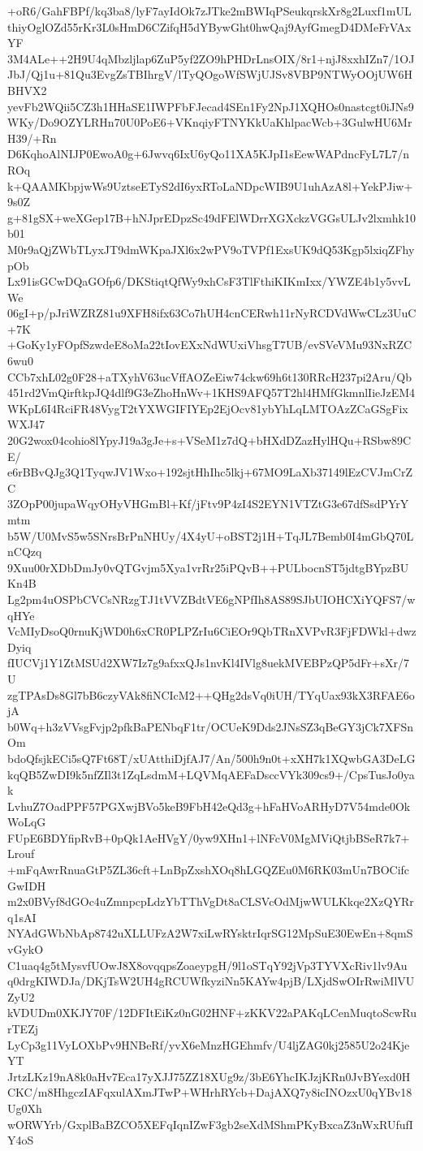+oR6/GahFBPf/kq3ba8/lyF7ayIdOk7zJTke2mBWIqPSeukqrskXr8g2Luxf1mUL
thiyOglOZd55rKr3L0sHmD6CZifqH5dYBywGht0hwQaj9AyfGmegD4DMeFrVAxYF
3M4ALe++2H9U4qMbzljlap6ZuP5yf2ZO9hPHDrLnsOIX/8r1+njJ8xxhIZn7/1OJ
JbJ/Qj1u+81Qu3EvgZsTBIhrgV/lTyQOgoWfSWjUJSv8VBP9NTWyOOjUW6HBHVX2
yevFb2WQii5CZ3h1HHaSE1IWPFbFJecad4SEn1Fy2NpJ1XQHOs0nastcgt0iJNs9
WKy/Do9OZYLRHn70U0PoE6+VKnqiyFTNYKkUaKhlpacWcb+3GulwHU6MrH39/+Rn
D6KqhoAlNIJP0EwoA0g+6Jwvq6IxU6yQo11XA5KJpI1sEewWAPdncFyL7L7/nROq
k+QAAMKbpjwWs9UztseETyS2dI6yxRToLaNDpcWIB9U1uhAzA8l+YekPJiw+9s0Z
g+81gSX+weXGep17B+hNJprEDpzSc49dFElWDrrXGXckzVGGsULJv2lxmhk10b01
M0r9aQjZWbTLyxJT9dmWKpaJXl6x2wPV9oTVPf1ExsUK9dQ53Kgp5lxiqZFhypOb
Lx91isGCwDQaGOfp6/DKStiqtQfWy9xhCsF3TlFthiKIKmIxx/YWZE4b1y5vvLWe
06gI+p/pJriWZRZ81u9XFH8ifx63Co7hUH4cnCERwh11rNyRCDVdWwCLz3UuC+7K
+GoKy1yFOpfSzwdeE8oMa22tIovEXxNdWUxiVhsgT7UB/evSVeVMu93NxRZC6wu0
CCb7xhL02g0F28+aTXyhV63ucVffAOZeEiw74ckw69h6t130RRcH237pi2Aru/Qb
451rd2VmQirftkpJQ4dlf9G3eZhoHnWv+1KHS9AFQ57T2hl4HMfGkmnlIieJzEM4
WKpL6I4RciFR48VygT2tYXWGIFIYEp2EjOcv81ybYhLqLMTOAzZCaGSgFixWXJ47
20G2wox04cohio8lYpyJ19a3gJe+s+VSeM1z7dQ+bHXdDZazHylHQu+RSbw89CE/
e6rBBvQJg3Q1TyqwJV1Wxo+192sjtHhIhc5lkj+67MO9LaXb37149lEzCVJmCrZC
3ZOpP00jupaWqyOHyVHGmBl+Kf/jFtv9P4zI4S2EYN1VTZtG3e67dfSsdPYrYmtm
b5W/U0MvS5w5SNrsBrPnNHUy/4X4yU+oBST2j1H+TqJL7Bemb0I4mGbQ70LnCQzq
9Xuu00rXDbDmJy0vQTGvjm5Xya1vrRr25iPQvB++PULbocnST5jdtgBYpzBUKn4B
Lg2pm4uOSPbCVCsNRzgTJ1tVVZBdtVE6gNPfIh8AS89SJbUIOHCXiYQFS7/wqHYe
VcMIyDsoQ0rnuKjWD0h6xCR0PLPZrIu6CiEOr9QbTRnXVPvR3FjFDWkl+dwzDyiq
fIUCVj1Y1ZtMSUd2XW7Iz7g9afxxQJs1nvKl4IVlg8uekMVEBPzQP5dFr+sXr/7U
zgTPAsDs8Gl7bB6czyVAk8fiNCIcM2++QHg2dsVq0iUH/TYqUax93kX3RFAE6ojA
b0Wq+h3zVVsgFvjp2pfkBaPENbqF1tr/OCUeK9Dds2JNsSZ3qBeGY3jCk7XFSnOm
bdoQfsjkECi5sQ7Ft68T/xUAtthiDjfAJ7/An/500h9n0t+xXH7k1XQwbGA3DeLG
kqQB5ZwDI9k5nfZIl3t1ZqLsdmM+LQVMqAEFaDsccVYk309cs9+/CpsTusJo0yak
LvhuZ7OadPPF57PGXwjBVo5keB9FbH42eQd3g+hFaHVoARHyD7V54mde0OkWoLqG
FUpE6BDYfipRvB+0pQk1AeHVgY/0yw9XHn1+lNFcV0MgMViQtjbBSeR7k7+Lrouf
+mFqAwrRnuaGtP5ZL36cft+LnBpZxshXOq8hLGQZEu0M6RK03mUn7BOCifcGwIDH
m2x0BVyf8dGOc4uZmnpcpLdzYbTThVgDt8aCLSVcOdMjwWULKkqe2XzQYRrq1sAI
NYAdGWbNbAp8742uXLLUFzA2W7xiLwRYsktrIqrSG12MpSuE30EwEn+8qmSvGykO
C1uaq4g5tMysvfUOwJ8X8ovqqpsZoaeypgH/9l1oSTqY92jVp3TYVXcRiv1lv9Au
q0drgKIWDJa/DKjTsW2UH4gRCUWfkyziNn5KAYw4pjB/LXjdSwOIrRwiMlVUZyU2
kVDUDm0XKJY70F/12DFItEiKz0nG02HNF+zKKV22aPAKqLCenMuqtoScwRurTEZj
LyCp3g11VyLOXbPv9HNBeRf/yvX6eMnzHGEhmfv/U4ljZAG0kj2585U2o24KjeYT
JrtzLKz19nA8k0aHv7Eca17yXJJ75ZZ18XUg9z/3bE6YhcIKJzjKRn0JvBYexd0H
CKC/m8HhgczIAFqxulAXmJTwP+WHrhRYcb+DajAXQ7y8icINOzxU0qYBv18Ug0Xh
wORWYrb/GxplBaBZCO5XEFqIqnIZwF3gb2seXdMShmPKyBxcaZ3nWxRUfufIY4oS
